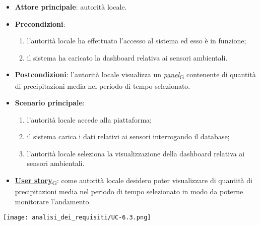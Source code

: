 \begin{itemize}
	\item \textbf{Attore principale}: autorità locale.
	\item \textbf{Precondizioni}:
	      \begin{enumerate}
		      \item l'autorità locale ha effettuato l'accesso al sistema ed esso è in funzione;
		      \item il sistema ha caricato la dashboard relativa ai sensori ambientali.
	      \end{enumerate}
	\item \textbf{Postcondizioni}: l'autorità locale visualizza un \href{https://7last.github.io/docs/rtb/documentazione-interna/glossario\#panel}{\textit{panel}\textsubscript{G}} contenente di quantità di precipitazioni media nel periodo di tempo selezionato.
	\item \textbf{Scenario principale}:
	      \begin{enumerate}
		      \item l'autorità locale accede alla piattaforma;
		      \item il sistema carica i dati relativi ai sensori interrogando il database;
		      \item l'autorità locale seleziona la visualizzazione della dashboard relativa ai sensori ambientali.
	      \end{enumerate}
	\item \href{https://7last.github.io/docs/rtb/documentazione-interna/glossario\#user-story}{\textbf{User story}\textsubscript{G}}: come autorità locale desidero poter visualizzare di quantità di precipitazioni media nel periodo di tempo selezionato
	      in modo da poterne monitorare l'andamento.
\end{itemize}
\begin{center}
	\texttt{[image: analisi\_dei\_requisiti/UC-6.3.png]}
\end{center}


